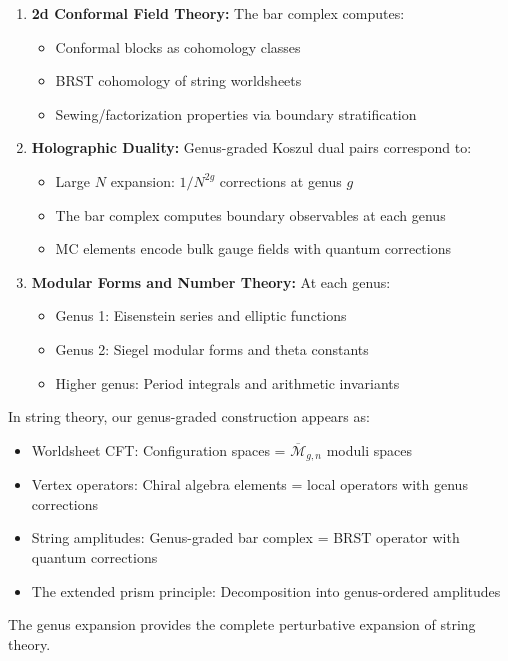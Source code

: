 \begin{enumerate}
\item \textbf{2d Conformal Field Theory:} The bar complex computes:
\begin{itemize}
\item Conformal blocks as cohomology classes
\item BRST cohomology of string worldsheets
\item Sewing/factorization properties via boundary stratification
\end{itemize}

\item \textbf{Holographic Duality:} Genus-graded Koszul dual pairs correspond to:
\begin{itemize}
\item Large $N$ expansion: $1/N^{2g}$ corrections at genus $g$
\item The bar complex computes boundary observables at each genus
\item MC elements encode bulk gauge fields with quantum corrections
\end{itemize}

\item \textbf{Modular Forms and Number Theory:} At each genus:
\begin{itemize}
\item Genus 1: Eisenstein series and elliptic functions
\item Genus 2: Siegel modular forms and theta constants
\item Higher genus: Period integrals and arithmetic invariants
\end{itemize}
\end{enumerate}

\begin{remark}
In string theory, our genus-graded construction appears as:
\begin{itemize}
\item Worldsheet CFT: Configuration spaces = $\overline{\mathcal{M}}_{g,n}$ moduli spaces
\item Vertex operators: Chiral algebra elements = local operators with genus corrections
\item String amplitudes: Genus-graded bar complex = BRST operator with quantum corrections
\item The extended prism principle: Decomposition into genus-ordered amplitudes
\end{itemize}
The genus expansion provides the complete perturbative expansion of string theory.
\end{remark}


